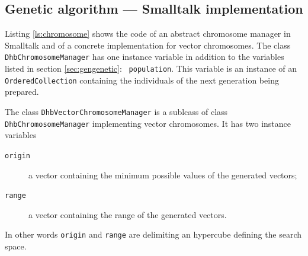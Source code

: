 \documentclass[twoside]{book}
\begin{document}
\subsection{Genetic algorithm --- Smalltalk implementation}
 Listing \ref{ls:chromosome}
shows the code of an abstract chromosome manager in Smalltalk and
of a concrete implementation for vector chromosomes. The class
{\tt DhbChromosomeManager} has one instance variable in addition
to the variables listed in section \ref{sec:gengenetic}: {\tt
population}. This variable is an instance of an {\tt
OrderedCollection} containing the individuals of the next
generation being prepared.

The class {\tt DhbVectorChromosomeManager} is a sublcass of class
{\tt DhbChromosomeManager} implementing vector chromosomes. It has
two instance variables
\begin{description}
  \item[\tt origin] a vector containing the minimum possible
  values of the generated vectors;
  \item[\tt range] a vector containing the range of the generated
  vectors.
\end{description}
In other words {\tt origin} and {\tt range} are delimiting an
hypercube defining the search space.
\end{document}
